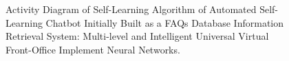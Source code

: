 \documentclass[12pt,oneside,openright,a4paper]{cpe-english-project}
\begin{document}
\begin{figure}[h!]
  \centering
  \setlength{\fboxrule}{0.2mm}
  \setlength{\fboxsep}{0.5cm}
  \caption{Activity Diagram of Self-Learning Algorithm of Automated Self-Learning Chatbot
  Initially Built as a FAQs Database Information Retrieval System: Multi-level and Intelligent
  Universal Virtual Front-Office Implement Neural Networks.}
  \label{fig:ch3_lr_activity_dg_self_learning_chatbot}
\end{figure}
\end{document}
